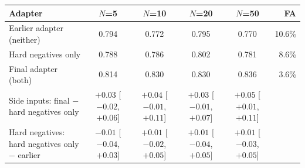 \begin{tabular}{lccccr}
\toprule
Adapter & $N$=5 & $N$=10 & $N$=20 & $N$=50 & FA \\
\midrule
Earlier adapter (neither) & 0.794 & 0.772 & 0.795 & 0.770 & 10.6\% \\
Hard negatives only & 0.788 & 0.786 & 0.802 & 0.781 & 8.6\% \\
Final adapter (both) & 0.814 & 0.830 & 0.830 & 0.836 & 3.6\% \\
Side inputs: final $-$ hard negatives only & $+0.03$ [$-0.02$, $+0.06$] & $+0.04$ [$-0.01$, $+0.11$] & $+0.03$ [$-0.01$, $+0.07$] & $+0.05$ [$+0.01$, $+0.11$] &  \\
Hard negatives: hard negatives only $-$ earlier & $-0.01$ [$-0.04$, $+0.03$] & $+0.01$ [$-0.02$, $+0.05$] & $+0.01$ [$-0.04$, $+0.05$] & $+0.01$ [$-0.03$, $+0.05$] &  \\
\bottomrule
\end{tabular}
